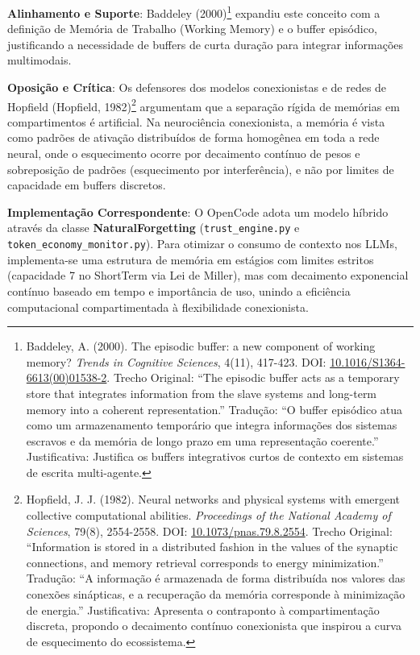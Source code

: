 \documentclass[12pt,a4paper,oneside]{abntex2}
\begin{document}
\textbf{Alinhamento e Suporte}: Baddeley (2000)\footnote{Baddeley, A. (2000). The episodic buffer: a new component of working memory? \textit{Trends in Cognitive Sciences}, 4(11), 417-423. DOI: \href{https://doi.org/10.1016/S1364-6613(00)01538-2}{10.1016/S1364-6613(00)01538-2}. Trecho Original: ``The episodic buffer acts as a temporary store that integrates information from the slave systems and long-term memory into a coherent representation.'' Tradução: ``O buffer episódico atua como um armazenamento temporário que integra informações dos sistemas escravos e da memória de longo prazo em uma representação coerente.'' Justificativa: Justifica os buffers integrativos curtos de contexto em sistemas de escrita multi-agente.} expandiu este conceito com a definição de Memória de Trabalho (Working Memory) e o buffer episódico, justificando a necessidade de buffers de curta duração para integrar informações multimodais.

\textbf{Oposição e Crítica}: Os defensores dos modelos conexionistas e de redes de Hopfield (Hopfield, 1982)\footnote{Hopfield, J. J. (1982). Neural networks and physical systems with emergent collective computational abilities. \textit{Proceedings of the National Academy of Sciences}, 79(8), 2554-2558. DOI: \href{https://doi.org/10.1073/pnas.79.8.2554}{10.1073/pnas.79.8.2554}. Trecho Original: ``Information is stored in a distributed fashion in the values of the synaptic connections, and memory retrieval corresponds to energy minimization.'' Tradução: ``A informação é armazenada de forma distribuída nos valores das conexões sinápticas, e a recuperação da memória corresponde à minimização de energia.'' Justificativa: Apresenta o contraponto à compartimentação discreta, propondo o decaimento contínuo conexionista que inspirou a curva de esquecimento do ecossistema.} argumentam que a separação rígida de memórias em compartimentos é artificial. Na neurociência conexionista, a memória é vista como padrões de ativação distribuídos de forma homogênea em toda a rede neural, onde o esquecimento ocorre por decaimento contínuo de pesos e sobreposição de padrões (esquecimento por interferência), e não por limites de capacidade em buffers discretos.

\textbf{Implementação Correspondente}: O OpenCode adota um modelo híbrido através da classe \textbf{NaturalForgetting} (\texttt{trust\_engine.py} e \texttt{token\_economy\_monitor.py}). Para otimizar o consumo de contexto nos LLMs, implementa-se uma estrutura de memória em estágios com limites estritos (capacidade 7 no ShortTerm via Lei de Miller), mas com decaimento exponencial contínuo baseado em tempo e importância de uso, unindo a eficiência computacional compartimentada à flexibilidade conexionista.
\end{document}
